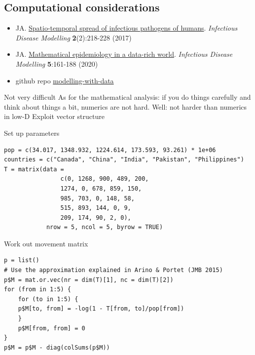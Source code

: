 \documentclass[aspectratio=169]{beamer}\usepackage[]{graphicx}\usepackage[]{xcolor}
\begin{document}




\subsection{Computational considerations}

\begin{frame}
	\begin{itemize}
		\item JA. \href{https://doi.org/10.1016/j.idm.2017.05.001}{Spatio-temporal spread of infectious pathogens of humans}. \emph{Infectious Disease Modelling} \textbf{2}(2):218-228 (2017)
		\item JA. \href{https://doi.org/10.1016/j.idm.2019.12.008}{Mathematical epidemiology in a data-rich world}. \emph{Infectious Disease Modelling} \textbf{5}:161-188 (2020)
		\item github repo \href{https://github.com/julien-arino/modelling-with-data}{modelling-with-data}
	\end{itemize}
\end{frame}

\begin{frame}{Not very difficult}
As for the mathematical analysis: if you do things carefully and think about things a bit, numerics are not hard. Well: not harder than numerics in low-D
\vfill
Exploit vector structure
\end{frame}

\begin{frame}[fragile]{Set up parameters}
\begin{lstlisting}
pop = c(34.017, 1348.932, 1224.614, 173.593, 93.261) * 1e+06
countries = c("Canada", "China", "India", "Pakistan", "Philippines")
T = matrix(data = 
				c(0, 1268, 900, 489, 200, 
				1274, 0, 678, 859, 150, 
				985, 703, 0, 148, 58, 
				515, 893, 144, 0, 9, 
				209, 174, 90, 2, 0), 
			nrow = 5, ncol = 5, byrow = TRUE)	
\end{lstlisting}
\end{frame}

\begin{frame}[fragile]{Work out movement matrix}
\begin{lstlisting}
p = list()
# Use the approximation explained in Arino & Portet (JMB 2015)
p$M = mat.or.vec(nr = dim(T)[1], nc = dim(T)[2])
for (from in 1:5) {
	for (to in 1:5) {
	p$M[to, from] = -log(1 - T[from, to]/pop[from])
	}
	p$M[from, from] = 0
}
p$M = p$M - diag(colSums(p$M))
\end{lstlisting}	
\end{frame}
\end{document}
